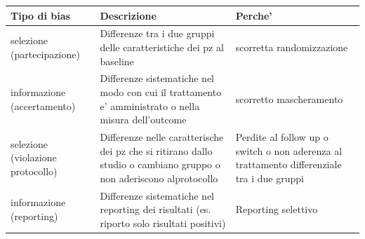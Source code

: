 \documentclass[]{book}
\begin{document}
\begin{longtable}[]{@{}lll@{}}
\toprule
\begin{minipage}[b]{0.30\columnwidth}\raggedright
Tipo di bias\strut
\end{minipage} & \begin{minipage}[b]{0.30\columnwidth}\raggedright
Descrizione\strut
\end{minipage} & \begin{minipage}[b]{0.30\columnwidth}\raggedright
Perche'\strut
\end{minipage}\tabularnewline
\midrule
\endhead
\begin{minipage}[t]{0.30\columnwidth}\raggedright
selezione (partecipazione)\strut
\end{minipage} & \begin{minipage}[t]{0.30\columnwidth}\raggedright
Differenze tra i due gruppi delle caratteristiche dei pz al baseline\strut
\end{minipage} & \begin{minipage}[t]{0.30\columnwidth}\raggedright
scorretta randomizzazione\strut
\end{minipage}\tabularnewline
\begin{minipage}[t]{0.30\columnwidth}\raggedright
informazione (accertamento)\strut
\end{minipage} & \begin{minipage}[t]{0.30\columnwidth}\raggedright
Differenze sistematiche nel modo con cui il trattamento e' amministrato o nella misura dell'outcome\strut
\end{minipage} & \begin{minipage}[t]{0.30\columnwidth}\raggedright
scorretto mascheramento\strut
\end{minipage}\tabularnewline
\begin{minipage}[t]{0.30\columnwidth}\raggedright
selezione (violazione protocollo)\strut
\end{minipage} & \begin{minipage}[t]{0.30\columnwidth}\raggedright
Differenze nelle caratterische dei pz che si ritirano dallo studio o cambiano gruppo o non aderiscono alprotocollo\strut
\end{minipage} & \begin{minipage}[t]{0.30\columnwidth}\raggedright
Perdite al follow up o switch o non aderenza al trattamento differenziale tra i due gruppi\strut
\end{minipage}\tabularnewline
\begin{minipage}[t]{0.30\columnwidth}\raggedright
informazione (reporting)\strut
\end{minipage} & \begin{minipage}[t]{0.30\columnwidth}\raggedright
Differenze sistematiche nel reporting dei risultati (es. riporto solo risultati positivi)\strut
\end{minipage} & \begin{minipage}[t]{0.30\columnwidth}\raggedright
Reporting selettivo\strut
\end{minipage}\tabularnewline
\bottomrule
\end{longtable}
\end{document}

